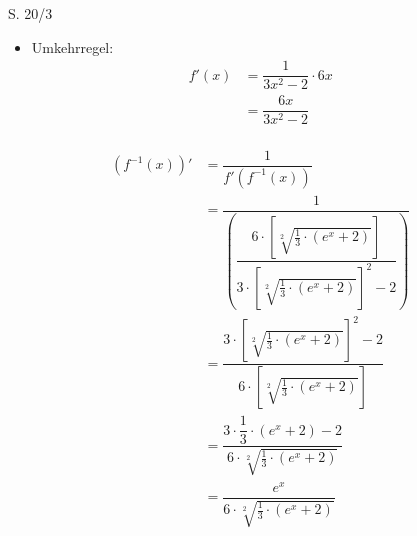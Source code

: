 \begin{Exercise}{S. 20/3}{}
\begin{enumerate}
\begin{enumerate}[label=\alph*)]
{\begin{itemize}[leftmargin=*]
{\begin{align*}
                        \end{align*}
                        }
                    \item Umkehrregel: \\[-2.0ex]{
                        \begin{align*}
                            f'(x) &= \dfrac{1}{3x^{2} -2} \cdot 6x && \\[1.5ex]
                            &= \dfrac{6x}{3x^{2} -2} &&
                        \end{align*}\\[-2.0ex]
                        \begin{align*}
                            \left(f^{-1}(x)\right)' &= \dfrac{1}{f'(f^{-1}(x))} && \\[2.0ex]
                            &= \dfrac{1}{\left(\dfrac{6 \cdot \left[\sqrt[2]{\frac{1}{3} \cdot \left(e^{x} + 2\right)}\right]}{3 \cdot \left[\sqrt[2]{\frac{1}{3} \cdot \left(e^{x} + 2\right)}\right]^{2} -2}\right)} &&\\[2.0ex]
                            &= \dfrac{3 \cdot \left[\sqrt[2]{\frac{1}{3} \cdot \left(e^{x} + 2\right)}\right]^{2} -2}{6 \cdot \left[\sqrt[2]{\frac{1}{3} \cdot \left(e^{x} + 2\right)}\right]} &&\\[2.0ex]
                            &= \dfrac{3 \cdot \dfrac{1}{3} \cdot \left(e^{x}+2\right) - 2}{6 \cdot \sqrt[2]{\frac{1}{3} \cdot \left(e^{x} + 2\right)}} && \\[2.0ex]
                            &= \dfrac{e^{x}}{6 \cdot \sqrt[2]{\frac{1}{3} \cdot \left(e^{x} + 2\right)}}
                        \end{align*}
                        }
                \end{itemize}
                }
        \end{enumerate}
    \end{enumerate}
\end{Exercise}

